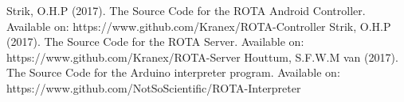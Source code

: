 
\begin{thebibliography}{3}
Strik, O.H.P (2017). The Source Code for the ROTA Android Controller. Available on: https://www.github.com/Kranex/ROTA-Controller
Strik, O.H.P (2017). The Source Code for the ROTA Server. Available on: https://www.github.com/Kranex/ROTA-Server
Houttum, S.F.W.M van (2017). The Source Code for the Arduino interpreter program. Available on: https://www.github.com/NotSoScientific/ROTA-Interpreter
\end{thebibliography}
